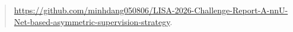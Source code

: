\documentclass[runningheads]{llncs}
\begin{document}
\begin{abstract}
\url{https://github.com/minhdang050806/LISA-2026-Challenge-Report-A-nnU-Net-based-asymmetric-supervision-strategy}.
\end{abstract}


\end{document}
